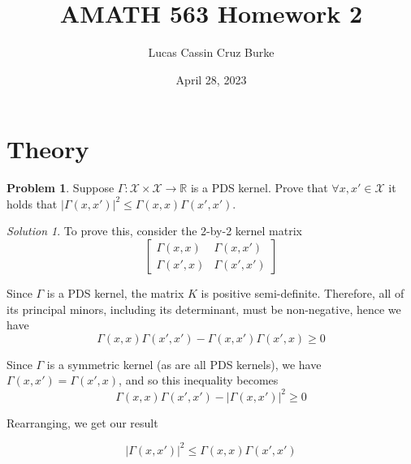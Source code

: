 \documentclass[12pt,a4paper]{article}
\title{AMATH 563 Homework 2}
\author{Lucas Cassin Cruz Burke}
\date{April 28, 2023}
\theoremstyle{definition}
\newtheorem{problem}{Problem}
\theoremstyle{remark}
\newtheorem*{solution}{Solution}
\begin{document}
\maketitle

\section{Theory}

\begin{problem}
    Suppose $\Gamma : \mathcal X \times \mathcal X \rightarrow \mathbb R$ is a PDS kernel. Prove that $\forall x, x' \in \mathcal X$ it holds that $|\Gamma(x,x')|^2 \le \Gamma(x,x) \Gamma(x',x')$. 
\end{problem}
\begin{solution}
    To prove this, consider the 2-by-2 kernel matrix $$\begin{bmatrix}
        \Gamma(x,x) & \Gamma(x,x') \\
        \Gamma(x',x) & \Gamma(x',x')
    \end{bmatrix}$$

    Since $\Gamma$ is a PDS kernel, the matrix $K$ is positive semi-definite. Therefore, all of its principal minors, including its determinant, must be non-negative, hence we have $$\Gamma(x,x)\Gamma(x',x') - \Gamma(x,x')\Gamma(x',x) \ge 0$$

    Since $\Gamma$ is a symmetric kernel (as are all PDS kernels), we have $\Gamma(x,x') = \Gamma(x',x)$, and so this inequality becomes $$\Gamma(x,x) \Gamma(x',x') - |\Gamma(x,x')|^2 \ge 0$$

    Rearranging, we get our result 

    $$|\Gamma(x,x')|^2 \le \Gamma(x,x)\Gamma(x',x')$$
\end{solution}
\end{document}
